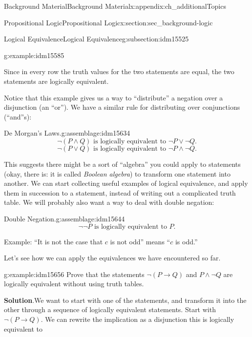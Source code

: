 \documentclass[oneside,10pt,]{book}
\numberwithin{equation}{chapter}
\def\imp{\rightarrow}
\begin{document}
\begin{appendixptx}{Background Material}{}{Background Material}{}{}{x:appendix:ch_additionalTopics}
\begin{sectionptx}{Propositional Logic}{}{Propositional Logic}{}{}{x:section:sec_background-logic}
\begin{subsectionptx}{Logical Equivalence}{}{Logical Equivalence}{}{}{g:subsection:idm15525}
\begin{example}{}{g:example:idm15585}
\begin{sidebyside}{1}{0}{0}{0}
\begin{sbspanel}{1}
{\par}
\end{sbspanel}%
\end{sidebyside}%
\par
Since in every row the truth values for the two statements are equal, the two statements are logically equivalent.%
\end{example}
Notice that this example gives us a way to ``distribute'' a negation over a disjunction (an ``or''). We have a similar rule for distributing over conjunctions (``and''s):%
\begin{assemblage}{De Morgan's Laws.}{g:assemblage:idm15634}%
%
\begin{equation*}
\neg(P \wedge Q) \text{ is logically equivalent to } \neg P \vee \neg Q.
\end{equation*}
%
\begin{equation*}
\neg(P \vee Q) \text{ is logically equivalent to } \neg P \wedge \neg Q.
\end{equation*}
%
\end{assemblage}
This suggests there might be a sort of ``algebra'' you could apply to statements (okay, there is: it is called \emph{Boolean algebra}) to transform one statement into another. We can start collecting useful examples of logical equivalence, and apply them in succession to a statement, instead of writing out a complicated truth table. We will probably also want a way to deal with double negation:%
\begin{assemblage}{Double Negation.}{g:assemblage:idm15644}%
%
\begin{equation*}
\neg \neg P \mbox{ is logically equivalent to } P.
\end{equation*}
%
\par
Example: ``It is not the case that \(c\) is not odd'' means ``\(c\) is odd.''%
\end{assemblage}
Let's see how we can apply the equivalences we have encountered so far.%
\begin{example}{}{g:example:idm15656}%
Prove that the statements \(\neg(P \imp Q)\) and \(P\wedge \neg Q\) are logically equivalent without using truth tables.%
\par\smallskip%
\noindent\textbf{Solution}.\hypertarget{g:solution:idm15661}{}\quad{}We want to start with one of the statements, and transform it into the other through a sequence of logically equivalent statements. Start with \(\neg(P \imp Q)\). We can rewrite the implication as a disjunction this is logically equivalent to%

\end{example}
\end{subsectionptx}
\end{sectionptx}
\end{appendixptx}
\end{document}

